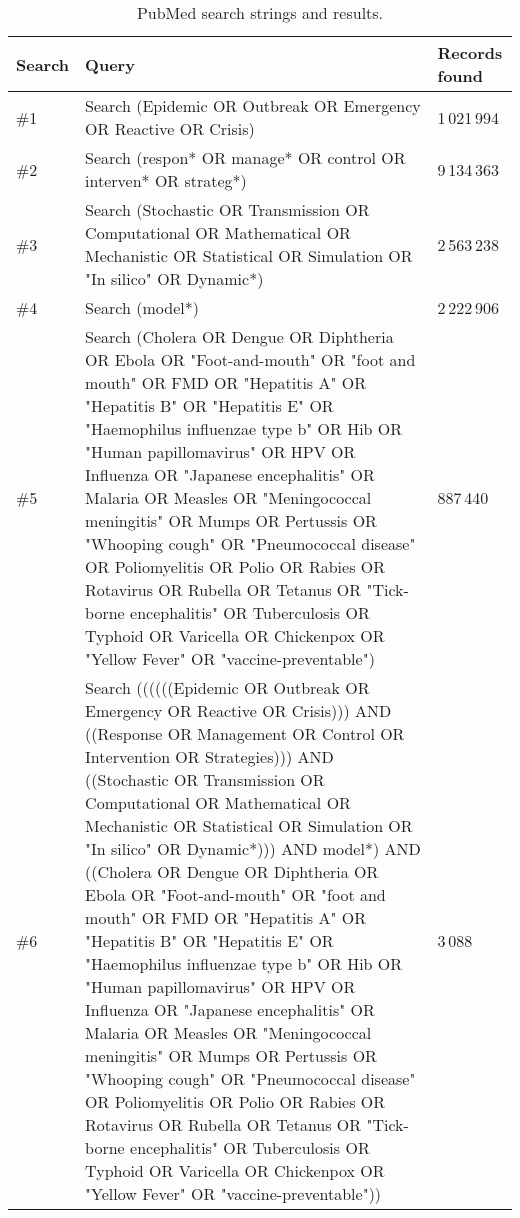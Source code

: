 \documentclass[10pt,a4paper]{article}
\begin{document}
\begin{sidewaysfigure}
	\begin{table}[H]
		\centering
		\caption{PubMed search strings and results.}
		\begin{tabular}{lp{}l}
			\toprule
			\textbf{Search} & \textbf{Query} & \textbf{Records found} \\
			\midrule
			\#1 & Search (Epidemic OR Outbreak OR   Emergency OR Reactive OR Crisis) & 1\,021\,994 \\
			\#2 & Search (respon*  OR    manage*  OR  control    OR  interven*  OR    strateg*) & 9\,134\,363 \\
			\#3 & Search (Stochastic OR Transmission   OR Computational OR Mathematical OR Mechanistic OR Statistical OR Simulation   OR "In silico" OR Dynamic*) & 2\,563\,238 \\
			\#4 & Search (model*) & 2\,222\,906 \\
			\#5 & Search (Cholera OR Dengue OR   Diphtheria OR Ebola OR  "Foot-and-mouth" OR "foot and   mouth" OR FMD OR "Hepatitis A" OR "Hepatitis B" OR   "Hepatitis E" OR "Haemophilus influenzae type b" OR Hib   OR "Human papillomavirus" OR HPV OR Influenza OR "Japanese   encephalitis" OR Malaria OR Measles OR "Meningococcal   meningitis" OR Mumps OR Pertussis OR "Whooping cough" OR   "Pneumococcal disease" OR Poliomyelitis OR Polio OR Rabies OR Rotavirus   OR Rubella OR Tetanus OR "Tick-borne encephalitis" OR Tuberculosis   OR Typhoid OR Varicella OR Chickenpox OR "Yellow Fever" OR   "vaccine-preventable") & 887\,440 \\
			\#6 & Search ((((((Epidemic OR Outbreak   OR Emergency OR Reactive OR Crisis)))  AND ((Response OR Management OR Control   OR Intervention OR Strategies))) AND ((Stochastic OR Transmission OR   Computational OR Mathematical OR Mechanistic OR Statistical OR Simulation OR   "In silico" OR Dynamic*))) AND model*) AND ((Cholera OR Dengue OR   Diphtheria OR Ebola OR  "Foot-and-mouth" OR "foot and   mouth" OR FMD OR "Hepatitis A" OR  "Hepatitis B" OR   "Hepatitis E" OR "Haemophilus influenzae type b" OR Hib  OR "Human papillomavirus" OR HPV OR Influenza OR "Japanese   encephalitis" OR Malaria OR Measles OR "Meningococcal   meningitis" OR Mumps OR Pertussis OR "Whooping cough" OR   "Pneumococcal disease" OR Poliomyelitis OR Polio OR Rabies OR   Rotavirus OR Rubella OR Tetanus OR "Tick-borne encephalitis" OR   Tuberculosis OR Typhoid OR Varicella OR Chickenpox OR "Yellow Fever" OR "vaccine-preventable")) & 3\,088 \\
			\bottomrule
		\end{tabular}
	\end{table}
\end{sidewaysfigure}
		
\end{document}
